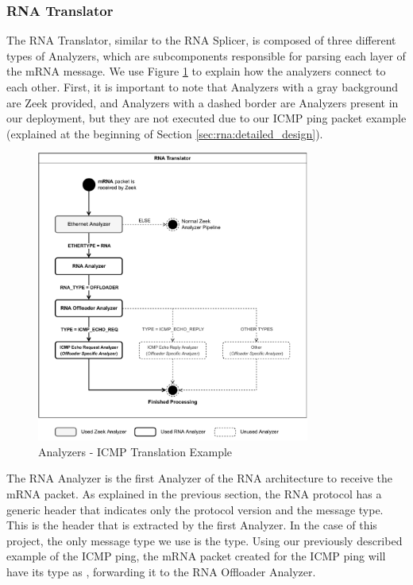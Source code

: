 \subsubsection*{RNA Translator}

The RNA Translator, similar to the RNA Splicer, is composed of three different types of Analyzers, which are subcomponents responsible for parsing each layer of the mRNA message. We use Figure \ref{fig:icmp_ex_translator} to explain how the analyzers connect to each other. First, it is important to note that Analyzers with a gray background are Zeek provided, and Analyzers with a dashed border are Analyzers present in our deployment, but they are not executed due to our ICMP ping packet example (explained at the beginning of Section \ref{sec:rna:detailed_design}).

\begin{figure}[ht]
    \caption{Analyzers - ICMP Translation Example}
    \begin{center}
        \includegraphics[width=0.8\textwidth]{images/icmp_ex_translator.pdf}  
    \end{center}
    \label{fig:icmp_ex_translator}
\end{figure}

The RNA Analyzer is the first Analyzer of the RNA architecture to receive the mRNA packet. As explained in the previous section, the RNA protocol has a generic header that indicates only the protocol version and the message type. This is the header that is extracted by the first Analyzer. In the case of this project, the only message type we use is the \Offloader{} type\footnotemark. Using our previously described example of the ICMP ping, the mRNA packet created for the ICMP ping will have its type as \textsc{\Offloader{}}, forwarding it to the RNA Offloader Analyzer.

